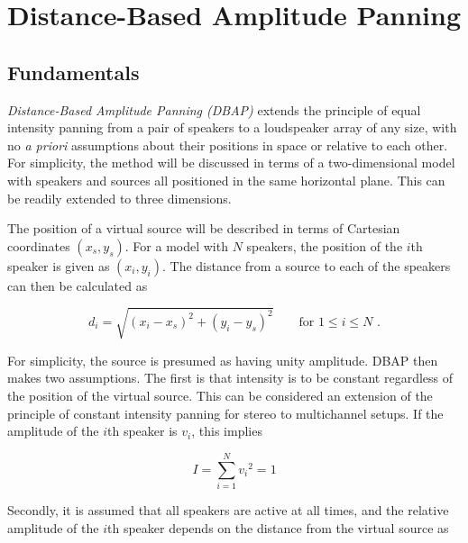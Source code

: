 \documentclass[twoside,10pt]{article}
\begin{document}
\section{Distance-Based Amplitude Panning}

\subsection{Fundamentals}


\textit{Distance-Based Amplitude Panning (DBAP)} extends the principle of equal intensity panning from a pair of speakers to a loudspeaker array of any size, with no \textit{a priori} assumptions about their positions in space or relative to each other.
For simplicity, the method will be discussed in terms of a two-dimensional model with speakers and sources all positioned in the same horizontal plane. This can be readily extended to three dimensions.

The position of a virtual source will be described in terms of Cartesian coordinates $(x_{s}, y_{s})$. For a model with $N$ speakers, the position of the $i$th speaker is given as $(x_{i}, y_{i})$. The distance from a source to each of the speakers can then be calculated as

\begin{equation} \label{eq:distance}
d_{i} = \sqrt{ {(x_{i} - x_{s})}^2 + {(y_{i} - y_{s})}^2 } \qquad \textrm{for } 1 \leq i \leq N \textrm{ .}
\end{equation}

For simplicity, the source is presumed as having unity amplitude. DBAP then makes two assumptions. The first is that intensity is to be constant regardless of the position of the virtual source. This can be considered an extension of the principle of constant intensity panning for stereo to multichannel setups. If the amplitude of the $i$th speaker is $v_{i}$, this implies

\begin{equation} \label{eq:constant_intensity}
I = \sum_{i=1}^{N} {v_{i}}^2 = 1
\end{equation}

Secondly, it is assumed that all speakers are active at all times, and the relative amplitude of the $i$th speaker depends on the distance from the virtual source as 
\end{document}
